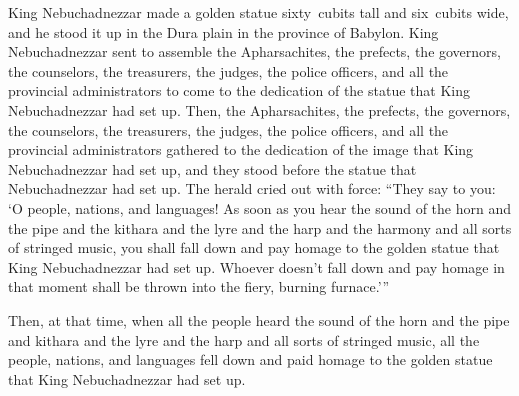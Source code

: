 
\begin{inparaenum}
   King Nebuchadnezzar made a golden statue sixty~cubits tall and six~cubits wide, and he stood it up in the Dura plain in the province of Babylon.%
   King Nebuchadnezzar sent to assemble the Apharsachites, the prefects, the governors, the counselors, the treasurers, the judges, the police officers, and all the provincial administrators to come to the dedication of the statue that King Nebuchadnezzar had set up.%
   Then, the Apharsachites, the prefects, the governors, the counselors, the treasurers, the judges, the police officers, and all the provincial administrators gathered to the dedication of the image that King Nebuchadnezzar had set up, and they stood before the statue that Nebuchadnezzar had set up.%
   The herald cried out with force: ``They say to you: `O people, nations, and languages!%
   As soon as you hear the sound of the horn and the pipe and the kithara and the lyre and the harp and the harmony and all sorts of stringed music, you shall fall down and pay homage to the golden statue that King Nebuchadnezzar had set up.%
   Whoever doesn't fall down and pay homage in that moment shall be thrown into the fiery, burning furnace.'\thinspace''%
  
   Then, at that time, when all the people heard the sound of the horn and the pipe and kithara and the lyre and the harp and all sorts of stringed music, all the people, nations, and languages fell down and paid homage to the golden statue that King Nebuchadnezzar had set up.%
  

\end{inparaenum}
